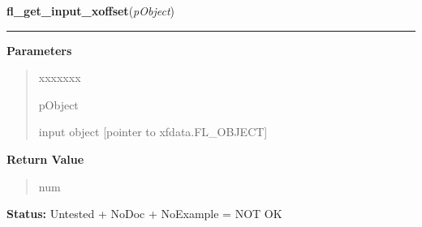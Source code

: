     \label{xformslib:library:fl_get_input_xoffset}

    \vspace{0.5ex}

\hspace{.8\funcindent}\begin{boxedminipage}{\funcwidth}

    \raggedright \textbf{fl\_get\_input\_xoffset}(\textit{pObject})

    \vspace{-1.5ex}

    \rule{\textwidth}{0.5\fboxrule}
\setlength{\parskip}{2ex}
\setlength{\parskip}{1ex}
      \textbf{Parameters}
      \vspace{-1ex}

      \begin{quote}
        \begin{Ventry}{xxxxxxx}

          \item[pObject]

          input object [pointer to xfdata.FL\_OBJECT]

        \end{Ventry}

      \end{quote}

      \textbf{Return Value}
    \vspace{-1ex}

      \begin{quote}
      num

      \end{quote}

\textbf{Status:} Untested + NoDoc + NoExample = NOT OK



    \end{boxedminipage}

    \label{xformslib:library:fl_set_input_fieldchar}

    \vspace{0.5ex}

